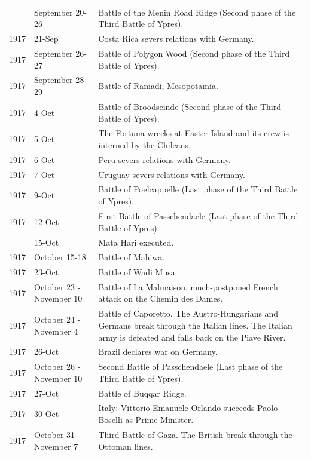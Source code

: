 \documentclass[
  openany]{book}
\begin{document}
\begin{longtable}[t]{rl>{\raggedright\arraybackslash}p{22em}}
\addlinespace
1917 & September 20-26 & Battle of the Menin Road Ridge (Second phase of the Third Battle of Ypres).\\
\rowcolor{gray!6}  1917 & 21-Sep & Costa Rica severs relations with Germany.\\
1917 & September 26-27 & Battle of Polygon Wood (Second phase of the Third Battle of Ypres).\\
\rowcolor{gray!6}  1917 & September 28-29 & Battle of Ramadi, Mesopotamia.\\
1917 & 4-Oct & Battle of Broodseinde (Second phase of the Third Battle of Ypres).\\
\addlinespace
\rowcolor{gray!6}  1917 & 5-Oct & The Fortuna wrecks at Easter Island and its crew is interned by the Chileans.\\
1917 & 6-Oct & Peru severs relations with Germany.\\
\rowcolor{gray!6}  1917 & 7-Oct & Uruguay severs relations with Germany.\\
1917 & 9-Oct & Battle of Poelcappelle (Last phase of the Third Battle of Ypres).\\
\rowcolor{gray!6}  1917 & 12-Oct & First Battle of Passchendaele (Last phase of the Third Battle of Ypres).\\
\addlinespace
1917 & 15-Oct & Mata Hari executed.\\
\rowcolor{gray!6}  1917 & October 15-18 & Battle of Mahiwa.\\
1917 & 23-Oct & Battle of Wadi Musa.\\
\rowcolor{gray!6}  1917 & October 23 - November 10 & Battle of La Malmaison, much-postponed French attack on the Chemin des Dames.\\
1917 & October 24 - November 4 & Battle of Caporetto. The Austro-Hungarians and Germans break through the Italian lines. The Italian army is defeated and falls back on the Piave River.\\
\addlinespace
\rowcolor{gray!6}  1917 & 26-Oct & Brazil declares war on Germany.\\
1917 & October 26 - November 10 & Second Battle of Passchendaele (Last phase of the Third Battle of Ypres).\\
\rowcolor{gray!6}  1917 & 27-Oct & Battle of Buqqar Ridge.\\
1917 & 30-Oct & Italy: Vittorio Emanuele Orlando succeeds Paolo Boselli as Prime Minister.\\
\rowcolor{gray!6}  1917 & October 31 - November 7 & Third Battle of Gaza. The British break through the Ottoman lines.\\

\end{longtable}
\end{document}
